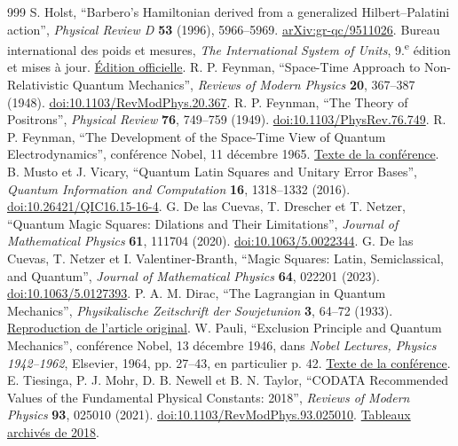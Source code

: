 \begin{thebibliography}{999}
 S. Holst, ``Barbero's Hamiltonian derived from a generalized Hilbert--Palatini action'', \emph{Physical Review D} \textbf{53} (1996), 5966--5969. \href{https://arxiv.org/abs/gr-qc/9511026}{arXiv:gr-qc/9511026}.
 Bureau international des poids et mesures, \emph{The International System of Units}, 9.\textsuperscript{e} édition et mises à jour. \href{https://www.bipm.org/en/publications/si-brochure}{Édition officielle}.
 R. P. Feynman, ``Space-Time Approach to Non-Relativistic Quantum Mechanics'', \emph{Reviews of Modern Physics} \textbf{20}, 367--387 (1948). \href{https://doi.org/10.1103/RevModPhys.20.367}{doi:10.1103/RevModPhys.20.367}.
 R. P. Feynman, ``The Theory of Positrons'', \emph{Physical Review} \textbf{76}, 749--759 (1949). \href{https://doi.org/10.1103/PhysRev.76.749}{doi:10.1103/PhysRev.76.749}.
 R. P. Feynman, ``The Development of the Space-Time View of Quantum Electrodynamics'', conférence Nobel, 11 décembre 1965. \href{https://www.nobelprize.org/prizes/physics/1965/feynman/lecture/}{Texte de la conférence}.
 B. Musto et J. Vicary, ``Quantum Latin Squares and Unitary Error Bases'', \emph{Quantum Information and Computation} \textbf{16}, 1318--1332 (2016). \href{https://doi.org/10.26421/QIC16.15-16-4}{doi:10.26421/QIC16.15-16-4}.
 G. De las Cuevas, T. Drescher et T. Netzer, ``Quantum Magic Squares: Dilations and Their Limitations'', \emph{Journal of Mathematical Physics} \textbf{61}, 111704 (2020). \href{https://doi.org/10.1063/5.0022344}{doi:10.1063/5.0022344}.
 G. De las Cuevas, T. Netzer et I. Valentiner-Branth, ``Magic Squares: Latin, Semiclassical, and Quantum'', \emph{Journal of Mathematical Physics} \textbf{64}, 022201 (2023). \href{https://doi.org/10.1063/5.0127393}{doi:10.1063/5.0127393}.
 P. A. M. Dirac, ``The Lagrangian in Quantum Mechanics'', \emph{Physikalische Zeitschrift der Sowjetunion} \textbf{3}, 64--72 (1933). \href{https://www.informationphilosopher.com/solutions/scientists/dirac/Lagrangian_1933.pdf}{Reproduction de l'article original}.
 W. Pauli, ``Exclusion Principle and Quantum Mechanics'', conférence Nobel, 13 décembre 1946, dans \emph{Nobel Lectures, Physics 1942--1962}, Elsevier, 1964, pp. 27--43, en particulier p. 42. \href{https://www.nobelprize.org/uploads/2018/06/pauli-lecture.pdf}{Texte de la conférence}.
 E. Tiesinga, P. J. Mohr, D. B. Newell et B. N. Taylor, ``CODATA Recommended Values of the Fundamental Physical Constants: 2018'', \emph{Reviews of Modern Physics} \textbf{93}, 025010 (2021). \href{https://doi.org/10.1103/RevModPhys.93.025010}{doi:10.1103/RevModPhys.93.025010}. \href{https://physics.nist.gov/cuu/Constants/ArchiveASCII/allascii_2018.txt}{Tableaux archivés de 2018}.

\end{thebibliography}
